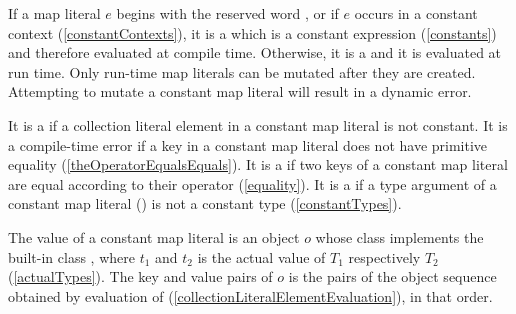 \documentclass[makeidx]{article}
\begin{document}
{

\LMHash{}%
If a map literal $e$ begins with the reserved word \CONST,
or if $e$ occurs in a constant context
(\ref{constantContexts}),
it is a
which is a constant expression
(\ref{constants})
and therefore evaluated at compile time.
Otherwise, it is a
and it is evaluated at run time.
Only run-time map literals can be mutated after they are created.
Attempting to mutate a constant map literal will result in a dynamic error.


\LMHash{}%
It is a 
if a collection literal element in a constant map literal is not constant.
It is a compile-time error if
a key in a constant map literal
does not have primitive equality
(\ref{theOperatorEqualsEquals}).
It is a
 if two keys of a constant map literal are equal
according to their \lit{==} operator
(\ref{equality}).
It is a  if a type argument of a constant map literal
()
is not a constant type
(\ref{constantTypes}).


\LMHash{}%
The value of a constant map literal
is an object $o$ whose class implements the built-in class
,
where $t_1$ and $t_2$ is the actual value of $T_1$ respectively $T_2$
(\ref{actualTypes}).
The key and value pairs of $o$ is
the pairs of the object sequence  obtained by
evaluation of 
(\ref{collectionLiteralElementEvaluation}),
in that order.

}
\end{document}

